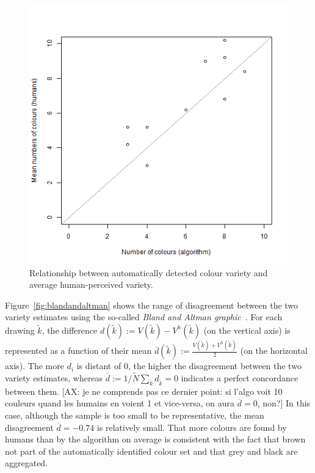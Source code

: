 \documentclass[11pt,a4paper]{article}
\begin{document}
\begin{figure}[h!]
	\centering
	\includegraphics[width=\linewidth]{figures/comp_nb_colours_scatter.png}
	\caption{Relationship between automatically detected colour variety and average human-perceived variety.}
	\label{fig:compnbcoloursscatter}
\end{figure}

Figure~\ref{fig:blandandaltman} shows the range of disagreement between the two variety estimates using the so-called \textit{Bland and Altman graphic}~\cite{bland1986}. For each drawing $\tilde{k}$, the difference $d(\tilde{k}) := V(\tilde{k}) - V^h(\tilde{k})$ (on the vertical axis) is represented as a function of their mean $\overline{d}(\tilde{k}) := \frac{V(\tilde{k}) + V^h(\tilde{k})}{2}$ (on the horizontal axis). The more $d_i$ is distant of  $0$, the higher the disagreement between the two variety estimates, whereas $\overline{d} := 1/\tilde{N}\sum_{\tilde{k}}d_{\tilde{k}} = 0$ indicates a perfect concordance between them. {\color{green}[AX: je ne comprends pas ce dernier point: si l'algo voit 10 couleurs quand les humains en voient 1 et vice-versa, on aura $\overline{d}=0$, non?]} In this case, although the sample is too small to be representative, the mean disagreement $\overline{d}=-0.74$ is relatively small. That more colours are found by humans than by the algorithm on average is consistent with the fact that brown not part of the automatically identified colour set and that grey and black are aggregated.
\end{document}
